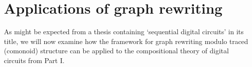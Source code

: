 \chapter{Applications of graph rewriting}



As might be expected from a thesis containing `sequential digital circuits' in
its title, we will now examine how the framework for graph rewriting modulo
traced (comonoid) structure can be applied to the compositional theory of
digital circuits from Part I.




